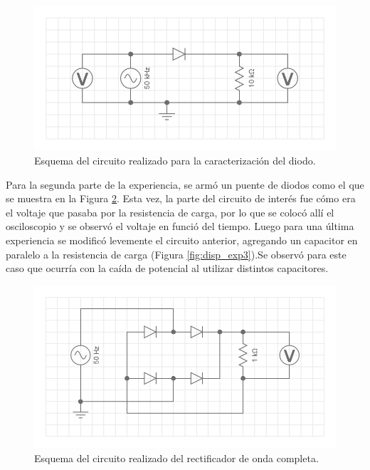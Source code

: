 \documentclass[twoside,twocolumn,a4paper]{article}
\begin{document}
\begin{figure}[H]
\includegraphics[width=\linewidth]{disp_exp.png}
\captionsetup{justification=centering}
\caption{Esquema del circuito realizado para la caracterizaci\'on del diodo.}
\label{fig:dsp_exp}
\end{figure}

Para la segunda parte de la experiencia, se arm\'o un puente de diodos como el que se muestra en la Figura \ref{fig:disp_exp2}. Esta vez, la parte del circuito de inter\'es fue c\'omo era el voltaje que pasaba por la resistencia de carga, por lo que se coloc\'o all\'i el osciloscopio y se observ\'o el voltaje en funci\'o del tiempo. Luego para una \'ultima experiencia se modific\'o levemente el circuito anterior, agregando un capacitor en paralelo a la resistencia de carga (Figura \ref{fig:disp_exp3}).Se observ\'o para este caso que ocurr\'ia con la ca\'ida de potencial al utilizar distintos capacitores. \par 

\begin{figure}[h]
\includegraphics[width=\linewidth]{disp_exp2.png}
\captionsetup{justification=centering}
\caption{Esquema del circuito realizado del rectificador de onda completa.}
\label{fig:disp_exp2}
\end{figure}
\end{document}
